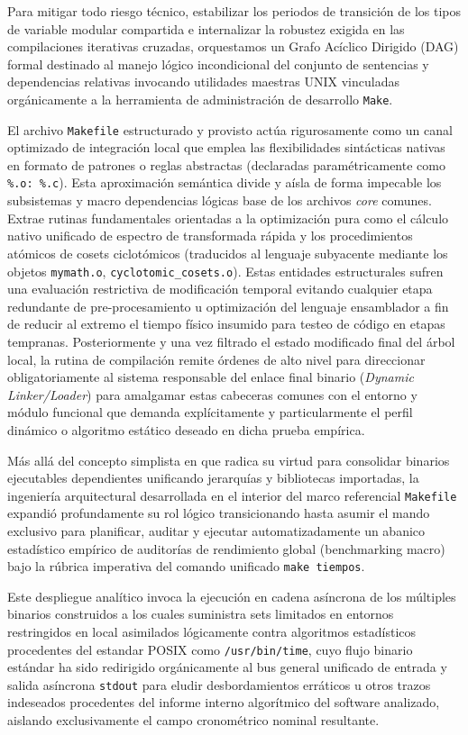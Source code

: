 \documentclass[12pt,a4paper]{tfg_domingo}
\begin{document}
Para mitigar todo riesgo técnico, estabilizar los periodos de transición de los tipos de variable modular compartida e internalizar la robustez exigida en las compilaciones iterativas cruzadas, orquestamos un Grafo Acíclico Dirigido (DAG) formal destinado al manejo lógico incondicional del conjunto de sentencias y dependencias relativas invocando utilidades maestras UNIX vinculadas orgánicamente a la herramienta de administración de desarrollo \texttt{Make}.

El archivo \texttt{Makefile} estructurado y provisto actúa rigurosamente como un canal optimizado de integración local que emplea las flexibilidades sintácticas nativas en formato de patrones o reglas abstractas (declaradas paramétricamente como \texttt{\%.o: \%.c}). Esta aproximación semántica divide y aísla de forma impecable los subsistemas y macro dependencias lógicas base de los archivos \emph{core} comunes. Extrae rutinas fundamentales orientadas a la optimización pura como el cálculo nativo unificado de espectro de transformada rápida y los procedimientos atómicos de cosets ciclotómicos (traducidos al lenguaje subyacente mediante los objetos \texttt{mymath.o}, \texttt{cyclotomic\_cosets.o}). Estas entidades estructurales sufren una evaluación restrictiva de modificación temporal evitando cualquier etapa redundante de pre-procesamiento u optimización del lenguaje ensamblador a fin de reducir al extremo el tiempo físico insumido para testeo de código en etapas tempranas. Posteriormente y una vez filtrado el estado modificado final del árbol local, la rutina de compilación remite órdenes de alto nivel para direccionar obligatoriamente al sistema responsable del enlace final binario (\emph{Dynamic Linker/Loader}) para amalgamar estas cabeceras comunes con el entorno y módulo funcional que demanda explícitamente y particularmente el perfil dinámico o algoritmo estático deseado en dicha prueba empírica.

Más allá del concepto simplista en que radica su virtud para consolidar binarios ejecutables dependientes unificando jerarquías y bibliotecas importadas, la ingeniería arquitectural desarrollada en el interior del marco referencial \texttt{Makefile} expandió profundamente su rol lógico transicionando hasta asumir el mando exclusivo para planificar, auditar y ejecutar automatizadamente un abanico estadístico empírico de auditorías de rendimiento global (benchmarking macro) bajo la rúbrica imperativa del comando unificado \texttt{make tiempos}.

Este despliegue analítico invoca la ejecución en cadena asíncrona de los múltiples binarios construidos a los cuales suministra sets limitados en entornos restringidos en local asimilados lógicamente contra algoritmos estadísticos procedentes del estandar POSIX como \texttt{/usr/bin/time}, cuyo flujo binario estándar ha sido redirigido orgánicamente al bus general unificado de entrada y salida asíncrona \texttt{stdout} para eludir desbordamientos erráticos u otros trazos indeseados procedentes del informe interno algorítmico del software analizado, aislando exclusivamente el campo cronométrico nominal resultante.
\end{document}
